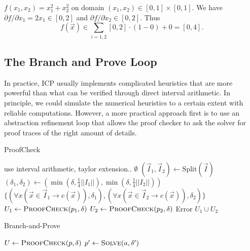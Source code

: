\documentclass{llncs}
\begin{document}
\begin{example}
$f(x_1, x_2) = x_1^2 + x_2^2$ on domain $(x_1,x_2)\in [0,1]\times[0,1]$. We have $\partial f/\partial x_1 = 2x_1\in [0,2]$ and $\partial f/\partial x_2\in [0,2]$. Thus
$$f(\vec x)\in \sum_{i=1,2} [0,2]\cdot (1-0) + 0 = [0,4].$$
\end{example}


\subsection{The Branch and Prove Loop}

In practice, ICP usually implements complicated heuristics that are more
powerful than what can be verified through direct interval arithmetic. In
principle, we could simulate the numerical heuristics to a certain extent with
reliable computations. However, a more practical approach first is to use an
abstraction refinement loop that allows the proof checker to ask the
solver for proof traces of the right amount of details.

\begin{algorithm}
  \centering
  \caption{ProofCheck}
  \label{alg:proofcheck}
  \begin{algorithmic}[1]
             \Comment use interval arithmetic, taylor extension..
                \State \Return $\emptyset$
            \Else
                \State $(\vec I_1, \vec I_2) \gets \mathrm{Split}(\vec I)$
                \State $(\delta_1, \delta_2) \gets (\min( \delta, \frac{1}{4}||I_1||), \min( \delta, \frac{1}{4}||I_2||))$
                \State \Return $\{
                (\forall x (\vec x\in \vec I_1 \rightarrow c(\vec x)), \delta_1),
                (\forall x (\vec x\in \vec I_2 \rightarrow c(\vec x)), \delta_2)
                \}$
            \EndIf
            \State $U_1 \gets \Call{ProofCheck}{p_1, \delta}$
            \State $U_2 \gets \Call{ProofCheck}{p_2, \delta}$
                \State \Return Error
            \Else
                \State \Return $U_1 \cup U_2$
            \EndIf
        \EndIf
    \EndProcedure
  \end{algorithmic}
\end{algorithm}

\begin{algorithm}
  \centering
  \caption{Branch-and-Prove}
  \label{alg:branch-and-prove}
  \begin{algorithmic}[1]
        \State $U \gets \Call{ProofCheck}{p, \delta}$
                \State $p' \gets \Call{Solve}{a, \delta'}$
                \State {}
            \EndFor
        \EndIf
    \EndProcedure
  \end{algorithmic}
\end{algorithm}
\end{document}
